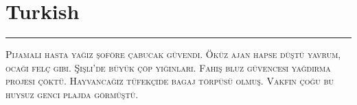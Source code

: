 \vspace{-1em}\section*{\checkno Turkish}
\vspace{-.5em}\hrule\vspace{.5em}
\noindent\textsc{
Pijamalı hasta yağız şoföre çabucak güvendi.
Öküz ajan hapse düştü yavrum, ocağı felç gibi.
Şişli’de büyük çöp yığınları.
Fahiş bluz güvencesi yağdırma projesi çöktü.
Hayvancağız tüfekçide bagaj törpüsü olmuş.
Vakfın çoğu bu huysuz genci plajda görmüştü.
}